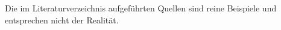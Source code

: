 \documentclass[titlepage,table]{article}
\begin{document}
% 

\pagestyle{fancy}                                    %
\fancyfoot{}                                         %
\renewcommand{\footrulewidth}{0.4pt}                 %
\fancyhead{}                                         %
\renewcommand{\headrulewidth}{0.4pt}                 %
\fancyhead[R]{\nouppercase{\leftmark}}                             %

\setcounter{tocdepth}{3}                            %
\setcounter{secnumdepth}{3}                         %
\tableofcontents
\newpage
\listoftables
\listoffigures
\newpage



\newpage
\nocite{*}                 %
\label{sec:literaturverzeichnis}

Die im Literaturverzeichnis aufgeführten Quellen sind reine Beispiele und entsprechen nicht der Realität.
\end{document}
